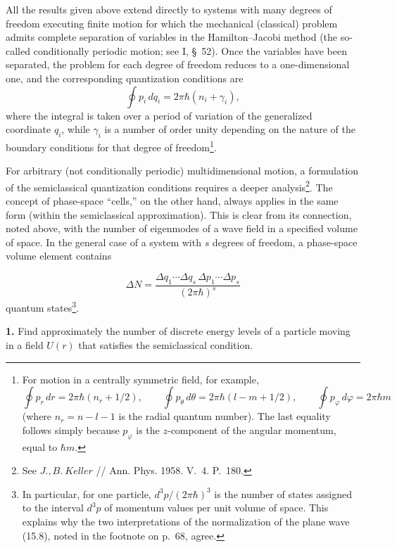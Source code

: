 All the results given above extend directly to systems with many degrees of
freedom executing finite motion for which the mechanical (classical) problem
admits complete separation of variables in the Hamilton--Jacobi method (the
so-called conditionally periodic motion; see I, §~52). Once the variables have
been separated, the problem for each degree of freedom reduces to a
one-dimensional one, and the corresponding quantization conditions are
\begin{equation}
  \oint p_i\,dq_i=2\pi\hbar(n_i+\gamma_i),
  \tag{48.6}
\end{equation}
where the integral is taken over a period of variation of the generalized
coordinate $q_i$, while $\gamma_i$ is a number of order unity depending on the
nature of the boundary conditions for that degree of freedom\footnote{For
motion in a centrally symmetric field, for example,
\[
  \oint p_r\,dr=2\pi\hbar(n_r+1/2),\qquad
  \oint p_\theta\,d\theta=2\pi\hbar(l-m+1/2),\qquad
  \oint p_\varphi\,d\varphi=2\pi\hbar m
\]
(where $n_r=n-l-1$ is the radial quantum number). The last equality follows
simply because $p_\varphi$ is the $z$-component of the angular momentum, equal
to $\hbar m$.}.

For arbitrary (not conditionally periodic) multidimensional motion, a
formulation of the semiclassical quantization conditions requires a deeper
analysis\footnote{See $J.,B.~Keller$ // Ann. Phys. 1958. V.~4. P.~180.}. The
concept of phase-space ``cells,'' on the other hand, always applies in the
same form (within the semiclassical approximation). This is clear from its
connection, noted above, with the number of eigenmodes of a wave field in a
specified volume of space. In the general case of a system with $s$ degrees
of freedom, a phase-space volume element contains

\begin{equation}
  \Delta N=\frac{\Delta q_1\cdots\Delta q_s\,
  \Delta p_1\cdots\Delta p_s}{(2\pi\hbar)^s}
  \tag{48.7}
\end{equation}
quantum states\footnote{In particular, for one particle,
$d^3p/(2\pi\hbar)^3$ is the number of states assigned to the interval $d^3p$
of momentum values per unit volume of space. This explains why the two
interpretations of the normalization of the plane wave (15.8), noted in the
footnote on p.~68, agree.}.

\ProblemHeading

\textbf{1.} Find approximately the number of discrete energy levels of a
particle moving in a field $U(r)$ that satisfies the semiclassical condition.

